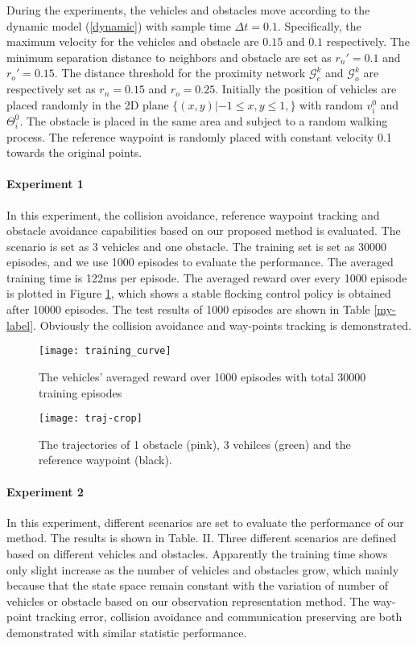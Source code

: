 \documentclass[letterpaper,10 pt,conference]{ieeeconf}
\begin{document}
During the experiments, the vehicles and obstacles move according to the dynamic model (\ref{dynamic}) with sample time $\Delta t = 0.1$. Specifically, the maximum velocity for the vehicles and obstacle are $0.15$ and $0.1$ respectively. The minimum separation distance to neighbors and obstacle are  set as $r_n' = 0.1$ and $r_o' = 0.15$. The distance threshold for the proximity network $\mathcal{G}_c^k$ and $\mathcal{G}_o^k$ are respectively set as $r_n = 0.15$ and $r_o = 0.25$.
Initially the position of vehicles are placed randomly in the 2D plane $\{(x,y)|-1\le x,y\le 1, \}$ with random $v_i^0$ and $\Theta_i^0$. The obstacle is placed in the same area and subject to a random walking process.  The reference waypoint is randomly placed with constant velocity 0.1 towards the original points. 

\paragraph{Experiment 1}
In this experiment, the collision avoidance, reference waypoint tracking and obstacle avoidance capabilities based on our proposed method is evaluated. The scenario is set as 3 vehicles and one obstacle. The training set is set as 30000 episodes, and we use 1000 episodes to evaluate the performance. The averaged training time is 122ms per episode. The averaged reward over every 1000 episode is plotted in Figure \ref{fig:training_curve}, which shows a stable flocking control policy is obtained after 10000 episodes. The test results of 1000 episodes are shown in Table \ref{my-label}. Obviously the collision avoidance and way-points tracking is demonstrated.
\begin{figure}
	\centering
	\texttt{[image: training\_curve]}
	\caption{The vehicles' averaged reward over 1000 episodes with total 30000 training episodes}
	\label{fig:training_curve}
\end{figure}
\begin{figure}
	\centering
	\texttt{[image: traj-crop]}
	\caption{The trajectories of 1 obstacle (pink), 3 vehilces (green) and the reference waypoint (black).}
	\label{fig:traj-crop}
\end{figure}


\paragraph{Experiment 2}
In this experiment, different scenarios are set to evaluate the performance of our method. The results is shown in Table. II. Three different scenarios are defined based on different vehicles and obstacles. Apparently the training time shows only slight increase  as the number of vehicles and obstacles grow, which mainly because that the state space remain constant with the variation of number of vehicles or obstacle based on our observation representation method. The way-point tracking error, collision avoidance and communication preserving are both demonstrated with similar statistic performance. 
\end{document}
